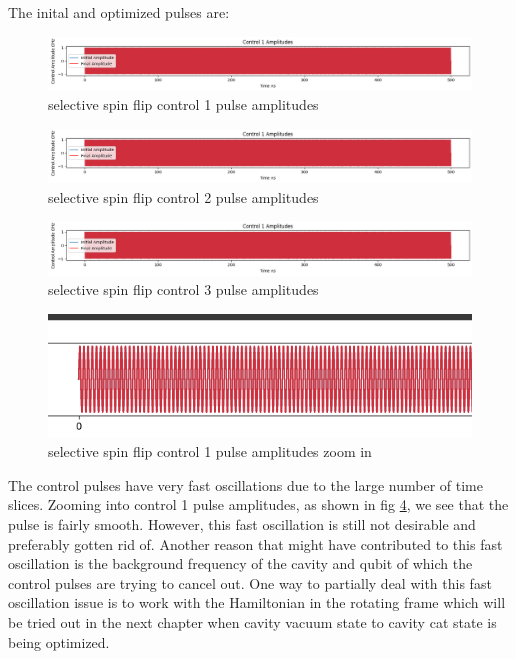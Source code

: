 \documentclass[12pt]{report}
\begin{document}
The inital and optimized pulses are: 
\begin{figure}[H]
    \centering
    \includegraphics[width=0.95\linewidth]{selective_spin_flip_GRAPE_control1.png}
    \caption{selective spin flip control 1 pulse amplitudes}
    \label{fig:selective_spin_flip_control1}
\end{figure}
\begin{figure}[H]
    \centering
    \includegraphics[width=0.95\linewidth]{selective_spin_flip_GRAPE_control1.png}
    \caption{selective spin flip control 2 pulse amplitudes}
    \label{fig:selective_spin_flip_control2}
\end{figure}
\begin{figure}[H]
    \centering
    \includegraphics[width=0.95\linewidth]{selective_spin_flip_GRAPE_control1.png}
    \caption{selective spin flip control 3 pulse amplitudes}
    \label{fig:selective_spin_flip_control3}
\end{figure}
\begin{figure}[H]
    \centering
    \includegraphics[width=0.95\linewidth]{selective_spin_flip_GRAPE_control1_zoomin.jpg}
    \caption{selective spin flip control 1 pulse amplitudes zoom in}
    \label{fig:selective_spin_flip_GRAPE_control1_zoomin}
\end{figure}

The control pulses have very fast oscillations due to the large number of time slices.
Zooming into control 1 pulse amplitudes, as shown in fig \ref{fig:selective_spin_flip_GRAPE_control1_zoomin},
we see that the pulse is fairly smooth. However, this fast oscillation is still not desirable and preferably gotten rid of. 
Another reason that might have contributed to this fast oscillation is the background frequency of the cavity and qubit 
of which the control pulses are trying to cancel out. One way to partially deal with this fast oscillation issue is to work
with the Hamiltonian in the rotating frame which will be tried out in the next chapter when cavity vacuum state to cavity cat state
is being optimized.  
\end{document}
